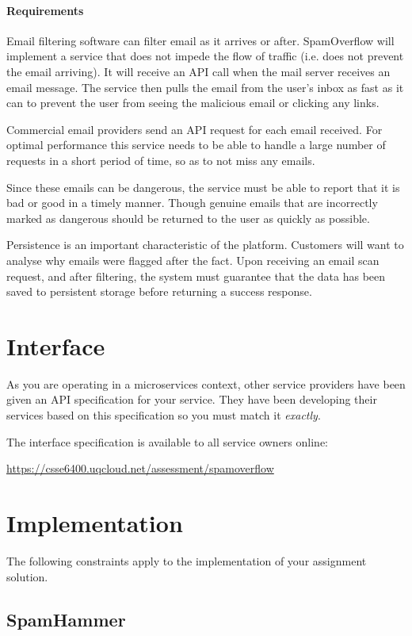\documentclass{csse4400}
\begin{document}
\paragraph{Requirements}
Email filtering software can filter email as it arrives or after.
SpamOverflow will implement a service that does not impede the flow of traffic (i.e. does not prevent the email arriving).
It will receive an API call when the mail server receives an email message.
The service then pulls the email from the user's inbox as fast as it can to prevent the user from seeing the malicious email or clicking any links.

Commercial email providers send an API request for each email received.
For optimal performance this service needs to be able to handle a large number of requests in a short period of time, so as to not miss any emails.

Since these emails can be dangerous, the service must be able to report that it is bad or good in a timely manner.
Though genuine emails that are incorrectly marked as dangerous should be returned to the user as quickly as possible.

Persistence is an important characteristic of the platform.
Customers will want to analyse why emails were flagged after the fact.
Upon receiving an email scan request, and after filtering, the system must guarantee that the data has been saved to persistent storage before returning a success response.

\section{Interface}
As you are operating in a microservices context, other service providers have been given an API specification for your service.
They have been developing their services based on this specification so you must match it \emph{exactly}.

The interface specification is available to all service owners online: 

\url{https://csse6400.uqcloud.net/assessment/spamoverflow}

\section{Implementation}
The following constraints apply to the implementation of your assignment solution.

\subsection{SpamHammer}
\end{document}
